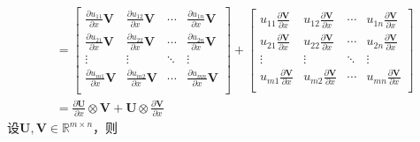 \documentclass{ctexart}
\theoremstyle{definition}
\def \Uv {\mathbf{U}}
\def \Vv {\mathbf{V}}
\def \Rbb {\mathbb{R}}
\begin{document}
\begin{align*}
                                                & = \begin{bmatrix}
        \frac{\partial u_{11}}{\partial x} \Vv & \frac{\partial u_{12}}{\partial x} \Vv & \cdots & \frac{\partial u_{1n}}{\partial x} \Vv \\
        \frac{\partial u_{21}}{\partial x} \Vv & \frac{\partial u_{22}}{\partial x} \Vv & \cdots & \frac{\partial u_{2n}}{\partial x} \Vv \\
        \vdots                                 & \vdots                                 & \ddots & \vdots                                 \\
        \frac{\partial u_{m1}}{\partial x} \Vv & \frac{\partial u_{m2}}{\partial x} \Vv & \cdots & \frac{\partial u_{mn}}{\partial x} \Vv \\
    \end{bmatrix} + \begin{bmatrix}
        u_{11} \frac{\partial \Vv}{\partial x} & u_{12} \frac{\partial \Vv}{\partial x} & \cdots & u_{1n} \frac{\partial \Vv}{\partial x} \\
        u_{21} \frac{\partial \Vv}{\partial x} & u_{22} \frac{\partial \Vv}{\partial x} & \cdots & u_{2n} \frac{\partial \Vv}{\partial x} \\
        \vdots                                 & \vdots                                 & \ddots & \vdots                                 \\
        u_{m1} \frac{\partial \Vv}{\partial x} & u_{m2} \frac{\partial \Vv}{\partial x} & \cdots & u_{mn} \frac{\partial \Vv}{\partial x} \\
    \end{bmatrix}                                   \\
                                                & = \frac{\partial \Uv}{\partial x} \otimes \Vv + \Uv \otimes \frac{\partial \Vv}{\partial x}
\end{align*}
设$\Uv, \Vv \in \Rbb^{m \times n}$，则
\end{document}
